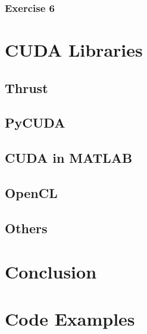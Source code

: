 \documentclass[12px,oz]{report}
\theoremstyle{indented}
\theoremstyle{indented}
\begin{document}
		\subsection{Exercise 6}
		\label{sec:exercise6}
		
		
\chapter{CUDA Libraries}
\label{ch-libraries}


	\section{Thrust}
	\label{sec-thrust}
	
	
	\section{PyCUDA}
	\label{sec-pycuda}
	
	
	\section{CUDA in MATLAB}
	\label{sec-matlab}
	
	
	\section{OpenCL}
	\label{sec-opencl}
	
	
	\section{Others}
	\label{sec-others}
	

\chapter{Conclusion}
\label{ch:conclusion}






\newpage
\appendix


\chapter{Code Examples}
\label{ch:app_code_examples}

\end{document}
